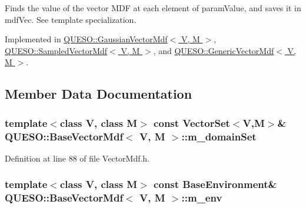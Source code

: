 Finds the value of the vector M\-D\-F at each element of {\ttfamily param\-Value}, and saves it in {\ttfamily mdf\-Vec}. See template specialization. 



Implemented in \hyperlink{class_q_u_e_s_o_1_1_gaussian_vector_mdf_a4b842d80858175ead566bd57aa334c0a}{Q\-U\-E\-S\-O\-::\-Gaussian\-Vector\-Mdf$<$ V, M $>$}, \hyperlink{class_q_u_e_s_o_1_1_sampled_vector_mdf_af4b8d3c492d7cfb94ac82da8df8779e9}{Q\-U\-E\-S\-O\-::\-Sampled\-Vector\-Mdf$<$ V, M $>$}, and \hyperlink{class_q_u_e_s_o_1_1_generic_vector_mdf_a0f414d8b4756eef7f28166752dc8d48d}{Q\-U\-E\-S\-O\-::\-Generic\-Vector\-Mdf$<$ V, M $>$}.



\subsection{Member Data Documentation}
\hypertarget{class_q_u_e_s_o_1_1_base_vector_mdf_a7f4804e5bb9d5947a4c7659605e8fa3b}{
\subsubsection[{m\-\_\-domain\-Set}]{\setlength{\rightskip}{0pt plus 5cm}template$<$class V, class M$>$ const {\bf Vector\-Set}$<$V,M$>$\& {\bf Q\-U\-E\-S\-O\-::\-Base\-Vector\-Mdf}$<$ V, M $>$\-::m\-\_\-domain\-Set\hspace{0.3cm}{\ttfamily [protected]}}}\label{class_q_u_e_s_o_1_1_base_vector_mdf_a7f4804e5bb9d5947a4c7659605e8fa3b}


Definition at line 88 of file Vector\-Mdf.\-h.

\hypertarget{class_q_u_e_s_o_1_1_base_vector_mdf_a39fbb4c9b12a0906a6d8c82535c837c7}{
\subsubsection[{m\-\_\-env}]{\setlength{\rightskip}{0pt plus 5cm}template$<$class V, class M$>$ const {\bf Base\-Environment}\& {\bf Q\-U\-E\-S\-O\-::\-Base\-Vector\-Mdf}$<$ V, M $>$\-::m\-\_\-env\hspace{0.3cm}{\ttfamily [protected]}}}\label{class_q_u_e_s_o_1_1_base_vector_mdf_a39fbb4c9b12a0906a6d8c82535c837c7}


